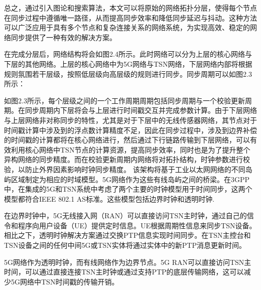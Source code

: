 \documentclass[UTF8,a4paper,12pt]{ctexart}
\numberwithin{equation}{section}
\begin{document}
	总之，通过引入图论和搜索算法，本文可以将原始的网络拓扑分层，使得每个节点在同步过程中遵循唯一路径，从而提高同步效率和降低同步延迟与抖动。这种方法可以广泛应用于具有多个节点和复杂连接关系的网络系统，为实现高效、稳定的网络同步提供了一种有效的解决方案。
	
	
	在完成分层后，网络结构将会如图2.4所示。此时网络可以分为上层的核心网络与下层的其他网络。上层的核心网络中为5G网络与TSN网络，下层网络内部将根据规则氛围若干层级，按照低层级向高层级的规则进行同步。同步周期可以如图2.3所示：
	
	\begin{figure}[htb]
	\end{figure}
	如图2.3所示，每个层级之间的一个工作周期周期包括同步周期与一个校验更新周期。在同步周期内下层将会与上层进行时间戳交互并完成参数计算。由于下层网络与上层网络非对称同步的特性，尤其是对于下层中的无线传感器网络，其节点对于时间戳计算中涉及到的浮点数计算精度不足，因此在同步过程中，涉及到边界补偿的时间戳的计算都将在核心网络进行，然后通过下行链路传输到下层网络，可以有效利用核心网络中TSN节点的计算资源，提高同步效率，同时也是为了提升整个异构网络的同步精度。而在校验更新周期内网络将对拓扑结构，时钟参数进行校验，以防止外界因素影响时钟同步精度。
	该架构将基于工业以太网网络的不同岛屿区域制定为相应的时域模型。5G网络作为这些有线岛屿之间的桥梁。在3GPP中，在集成的5G和TSN系统中考虑了两个主要的时钟模型用于时间同步，这两个模型都符合IEEE 802.1 AS标准。这些模型包括边界时钟和透明时钟\cite{9615318}.
	
	在边界时钟中，5G无线接入网（RAN）可以直接访问TSN主时钟，通过自己的信令和程序向用户设备（UE）提供定时信息。UE根据周期性信息来同步TSN设备。相比之下，透明时钟解决方案通过交换PTP信息实现时间同步。在TSN主控台和TSN设备之间的任何中间5G或TSN实体将通过实体中的新PTP消息更新时间。
	
	5G网络作为透明时钟，而有线网络作为边界节点。5G RAN可以直接访问TSN主时间，可以通过直接连接TSN主时钟或通过支持PTP的底层传输网络，这可以减少5G网络中TSN时间戳的传输开销。
	
\end{document}

